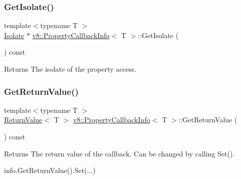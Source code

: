 \subsubsection{\texorpdfstring{Get\+Isolate()}{GetIsolate()}}
{\footnotesize\ttfamily template$<$typename T $>$ \\
\mbox{\hyperlink{classv8_1_1Isolate}{Isolate}} $\ast$ \mbox{\hyperlink{classv8_1_1PropertyCallbackInfo}{v8\+::\+Property\+Callback\+Info}}$<$ T $>$\+::Get\+Isolate (\begin{DoxyParamCaption}{ }\end{DoxyParamCaption}) const}

\begin{DoxyReturn}{Returns}
The isolate of the property access. 
\end{DoxyReturn}
\mbox{\label{classv8_1_1PropertyCallbackInfo_aa0882946929c3c4df6d131fe0d8d6746}} 
\subsubsection{\texorpdfstring{Get\+Return\+Value()}{GetReturnValue()}}
{\footnotesize\ttfamily template$<$typename T $>$ \\
\mbox{\hyperlink{classv8_1_1ReturnValue}{Return\+Value}}$<$ T $>$ \mbox{\hyperlink{classv8_1_1PropertyCallbackInfo}{v8\+::\+Property\+Callback\+Info}}$<$ T $>$\+::Get\+Return\+Value (\begin{DoxyParamCaption}{ }\end{DoxyParamCaption}) const}

\begin{DoxyReturn}{Returns}
The return value of the callback. Can be changed by calling Set(). 
\begin{DoxyCode}
info.GetReturnValue().Set(...)
\end{DoxyCode}
 
\end{DoxyReturn}
\mbox{\label{classv8_1_1PropertyCallbackInfo_a66b7ec267f18bd84e8baf0a0e16187b9}} 
